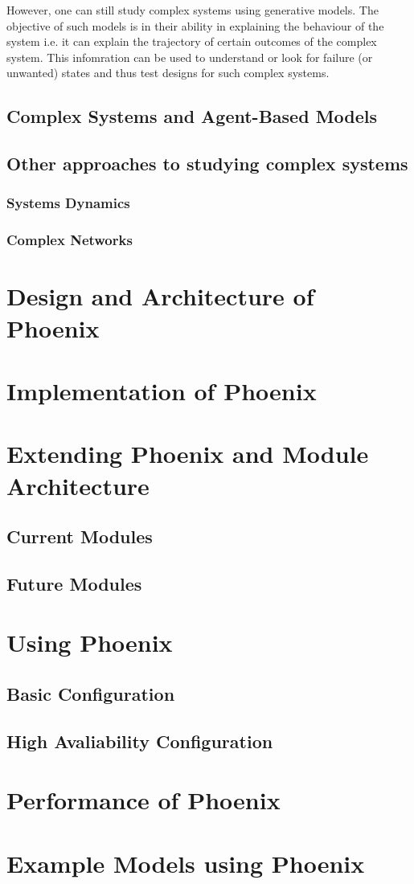 \documentclass[a4paper,12pt]{report}
\begin{document}
However, one can still study complex systems using generative
models. The objective of such models is in their ability in explaining
the behaviour of the system i.e. it can explain the trajectory of
certain outcomes of the complex system. This infomration can be used
to understand or look for failure (or unwanted) states and thus test
designs for such complex systems.
\section{Complex Systems and Agent-Based Models}
\section{Other approaches to studying complex systems}
\subsection{Systems Dynamics}
\subsection{Complex Networks}

\chapter{Design and Architecture of Phoenix}


\chapter{Implementation of Phoenix}


\chapter{Extending Phoenix and Module Architecture}
\section{Current Modules}
\section{Future Modules}

\chapter{Using Phoenix}
\section{Basic Configuration}
\section{High Avaliability Configuration}

\chapter{Performance of Phoenix}

\chapter{Example Models using Phoenix}
\end{document}
